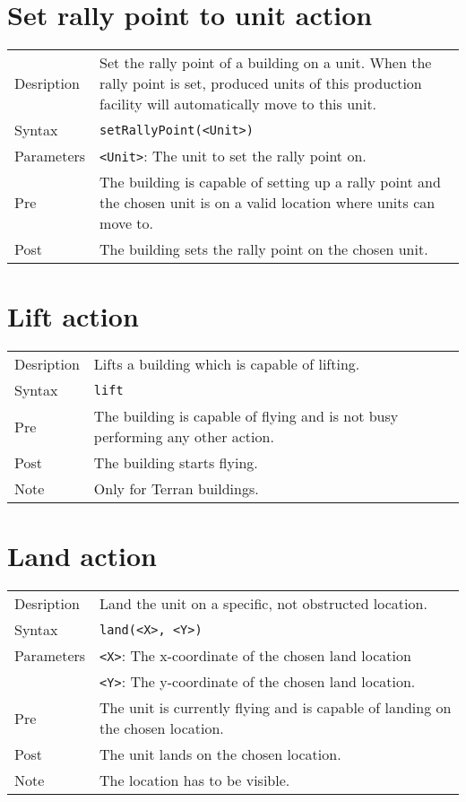\section{Set rally point to unit action}
\begin{tabularx}{\textwidth}{lX}
 Desription & Set the rally point of a building on a unit. When the rally point is set, produced units of this production facility will automatically move to this unit. \\
 Syntax & \verb|setRallyPoint(<Unit>)| \\
 Parameters & \verb|<Unit>|: The unit to set the rally point on.\\
 Pre & The building is capable of setting up a rally point and the chosen unit is on a valid location where units can move to. \\
 Post & The building sets the rally point on the chosen unit.
\end{tabularx}

\section{Lift action}
\begin{tabularx}{\textwidth}{lX}
 Desription & Lifts a building which is capable of lifting. \\
 Syntax & \verb|lift| \\
 Pre & The building is capable of flying and is not busy performing any other action. \\
 Post & The building starts flying. \\
 Note & Only for Terran buildings.
\end{tabularx}

\section{Land action}
\begin{tabularx}{\textwidth}{lX}
 Desription & Land the unit on a specific, not obstructed location. \\
 Syntax & \verb|land(<X>, <Y>)| \\
 Parameters & \verb|<X>|: The x-coordinate of the chosen land location \\
            & \verb|<Y>|: The y-coordinate of the chosen land location. \\
 Pre & The unit is currently flying and is capable of landing on the chosen location. \\
 Post & The unit lands on the chosen location. \\
 Note & The location has to be visible.
\end{tabularx}

